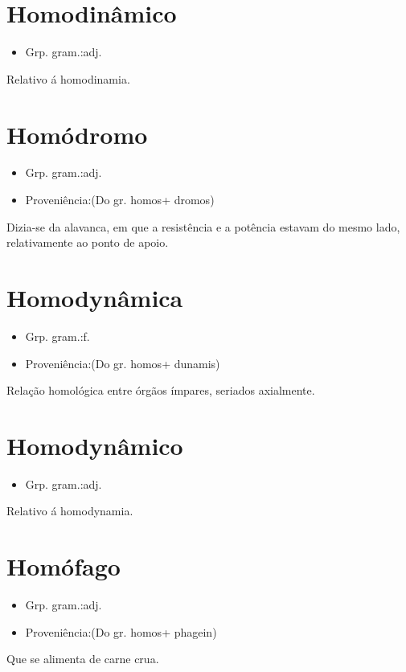 \documentclass{article}
\begin{document}
\section{Homodinâmico}
\begin{itemize}
\item {Grp. gram.:adj.}
\end{itemize}
Relativo á homodinamia.
\section{Homódromo}
\begin{itemize}
\item {Grp. gram.:adj.}
\end{itemize}
\begin{itemize}
\item {Proveniência:(Do gr. \textunderscore homos\textunderscore  + \textunderscore dromos\textunderscore )}
\end{itemize}
Dizia-se da alavanca, em que a resistência e a potência estavam do mesmo lado, relativamente ao ponto de apoio.
\section{Homodynâmica}
\begin{itemize}
\item {Grp. gram.:f.}
\end{itemize}
\begin{itemize}
\item {Proveniência:(Do gr. \textunderscore homos\textunderscore  + \textunderscore dunamis\textunderscore )}
\end{itemize}
Relação homológica entre órgãos ímpares, seriados axialmente.
\section{Homodynâmico}
\begin{itemize}
\item {Grp. gram.:adj.}
\end{itemize}
Relativo á homodynamia.
\section{Homófago}
\begin{itemize}
\item {Grp. gram.:adj.}
\end{itemize}
\begin{itemize}
\item {Proveniência:(Do gr. \textunderscore homos\textunderscore  + \textunderscore phagein\textunderscore )}
\end{itemize}
Que se alimenta de carne crua.
\end{document}
